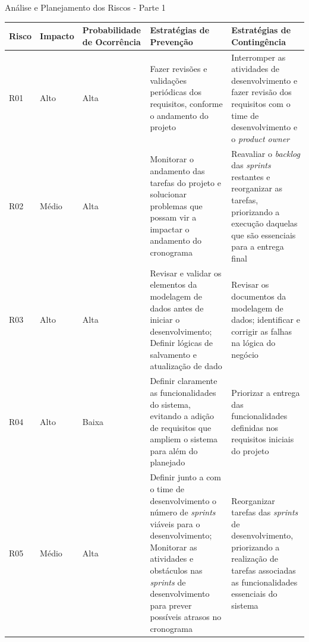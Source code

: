 \documentclass[
	12pt,				%
	openany,			%
	twoside,			%
	a4paper,			%
	english,			%
	french,				%
	spanish,			%
	brazil				%
	]{abntex2}
\begin{document}
 
 \begin{quadro}[H]
 	\caption{Análise e Planejamento dos Riscos - Parte 1}
 	 \label{analise_riscos_1} 
 	 \begin{tabular} {|p{1cm}|p{1.6cm}|p{3cm}|p{4.7cm}|p{4.7cm}|}
 		\hline
 		\textbf{Risco} & \textbf{Impacto} & \textbf{Probabilidade de  Ocorrência} & \textbf{Estratégias de \newline Prevenção} & \textbf{Estratégias de \newline Contingência}\\
 		\hline
 	 	R01 & Alto & Alta &
	 	Fazer revisões e validações periódicas dos requisitos, conforme o andamento do projeto  & Interromper as atividades de desenvolvimento e fazer revisão dos requisitos com o time de desenvolvimento e o \textit{product owner}\\
	 	\hline
	 	R02 & Médio & Alta &
	 	Monitorar o andamento das tarefas do projeto e solucionar problemas que possam vir a impactar o andamento do cronograma  & Reavaliar o \textit {backlog} das \textit{sprints} restantes e reorganizar as tarefas, priorizando a execução daquelas que são essenciais para a entrega final \\
	 	\hline
	 	R03 & Alto & Alta &
	 	Revisar e validar os elementos da modelagem de dados antes de iniciar o desenvolvimento; Definir lógicas de salvamento e atualização de dado  & Revisar os documentos da modelagem de dados;  identificar e corrigir as falhas na lógica do negócio \\
	 	\hline
	 	R04 & Alto & Baixa &
	 	Definir claramente as funcionalidades do sistema, evitando a adição de requisitos que ampliem o sistema para além do planejado  & Priorizar a entrega das funcionalidades definidas nos requisitos iniciais do projeto \\
	 	\hline
	 	R05 & Médio & 	Alta &
	 	Definir junto a com o time de desenvolvimento o número de \textit{sprints} viáveis para o desenvolvimento; Monitorar as atividades e obstáculos nas \textit{sprints} de desenvolvimento para prever possíveis atrasos no cronograma & Reorganizar tarefas das \textit{sprints} de desenvolvimento, priorizando a realização de tarefas associadas as funcionalidades essenciais do sistema \\
	 	\hline
	\end{tabular}
	 	\end{quadro}
\end{document}

